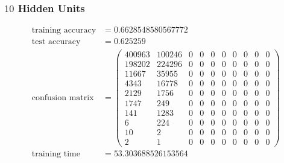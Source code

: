 \documentclass[11pt]{article}
\begin{document}
\subsubsection{$10$ Hidden Units}
\begin{equation}
  \begin{split}
    \text{training accuracy} &= 0.6628548580567772\\
    \text{test accuracy} &= 0.625259\\
    \text{confusion matrix} &=
    \begin{pmatrix}
      400963 & 100246 & 0 & 0 & 0 & 0 & 0 & 0 & 0 & 0 \\
      198202 & 224296 & 0 & 0 & 0 & 0 & 0 & 0 & 0 & 0 \\
      11667  & 35955  & 0 & 0 & 0 & 0 & 0 & 0 & 0 & 0 \\
      4343   & 16778  & 0 & 0 & 0 & 0 & 0 & 0 & 0 & 0 \\
      2129   & 1756   & 0 & 0 & 0 & 0 & 0 & 0 & 0 & 0 \\
      1747   & 249    & 0 & 0 & 0 & 0 & 0 & 0 & 0 & 0 \\
      141    & 1283   & 0 & 0 & 0 & 0 & 0 & 0 & 0 & 0 \\
      6      & 224    & 0 & 0 & 0 & 0 & 0 & 0 & 0 & 0 \\
      10     & 2      & 0 & 0 & 0 & 0 & 0 & 0 & 0 & 0 \\
      2      & 1      & 0 & 0 & 0 & 0 & 0 & 0 & 0 & 0
    \end{pmatrix}\\
    \text{training time} &= 53.303688526153564
  \end{split}
\end{equation}
\end{document}

